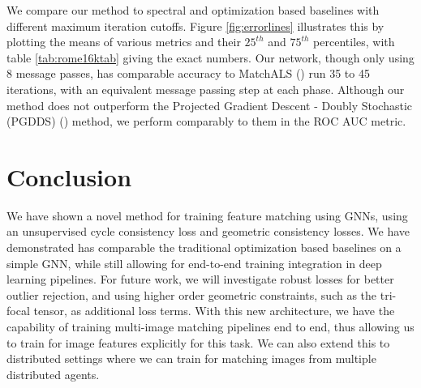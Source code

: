 \documentclass{article} %
\begin{document}
We compare our method to spectral and optimization based baselines with different maximum iteration cutoffs.
Figure \ref{fig:errorlines} illustrates this by plotting the means of various metrics and their $25^{th}$ and $75^{th}$ percentiles, with table \ref{tab:rome16ktab} giving the exact numbers.
Our network, though only using 8 message passes, has comparable accuracy to MatchALS (\cite{zhou2015multi}) run 35 to 45 iterations, with an equivalent message passing step at each phase.
Although our method does not outperform the Projected Gradient Descent - Doubly Stochastic (PGDDS) (\cite{leonardos2016distributed}) method, we perform comparably to them in the ROC AUC metric.

\section{Conclusion}

We have shown a novel method for training feature matching using GNNs, using an unsupervised cycle consistency loss and geometric consistency losses.
We have demonstrated has comparable the traditional optimization based baselines on a simple GNN, while still allowing for end-to-end training integration in deep learning pipelines.
For future work, we will investigate robust losses for better outlier rejection, and using higher order geometric constraints, such as the tri-focal tensor, as additional loss terms.
With this new architecture, we have the capability of training multi-image matching pipelines end to end, thus allowing us to train for image features explicitly for this task.
We can also extend this to distributed settings where we can train for matching images from multiple distributed agents. 
\end{document}

